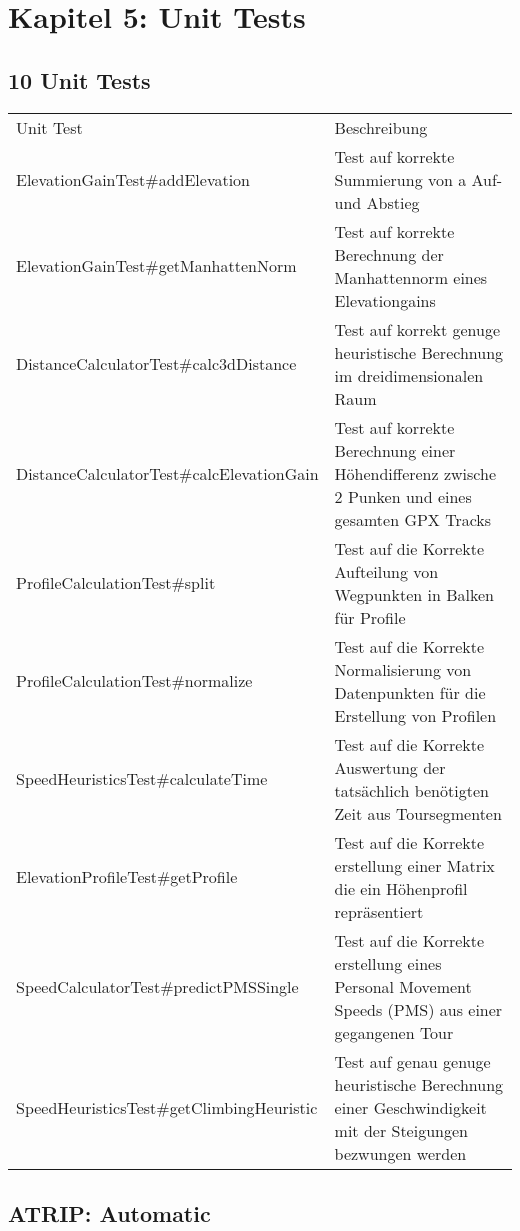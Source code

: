 \section{Kapitel 5: Unit Tests}

\subsection{10 Unit Tests}

\begin{tabularx}{16cm}{l X}

Unit Test & Beschreibung \\
ElevationGainTest\#addElevation & Test auf korrekte Summierung von a Auf- und Abstieg \\
ElevationGainTest\#getManhattenNorm & Test auf korrekte Berechnung der Manhattennorm eines Elevationgains \\
DistanceCalculatorTest\#calc3dDistance & Test auf korrekt genuge heuristische Berechnung im dreidimensionalen Raum \\
DistanceCalculatorTest\#calcElevationGain & Test auf korrekte Berechnung einer Höhendifferenz zwische 2 Punken und eines gesamten GPX Tracks \\
ProfileCalculationTest\#split & Test auf die Korrekte Aufteilung von Wegpunkten in Balken für Profile  \\
ProfileCalculationTest\#normalize & Test auf die Korrekte Normalisierung von Datenpunkten für die Erstellung von Profilen \\
SpeedHeuristicsTest\#calculateTime & Test auf die Korrekte Auswertung der tatsächlich benötigten Zeit aus Toursegmenten \\
ElevationProfileTest\#getProfile & Test auf die Korrekte erstellung einer Matrix die ein Höhenprofil repräsentiert \\
SpeedCalculatorTest\#predictPMSSingle &  Test auf die Korrekte erstellung eines Personal Movement Speeds (PMS) aus einer gegangenen Tour \\
SpeedHeuristicsTest\#getClimbingHeuristic & Test auf genau genuge heuristische Berechnung einer Geschwindigkeit mit der Steigungen bezwungen werden \\

\end{tabularx}

\subsection{ATRIP: Automatic}

